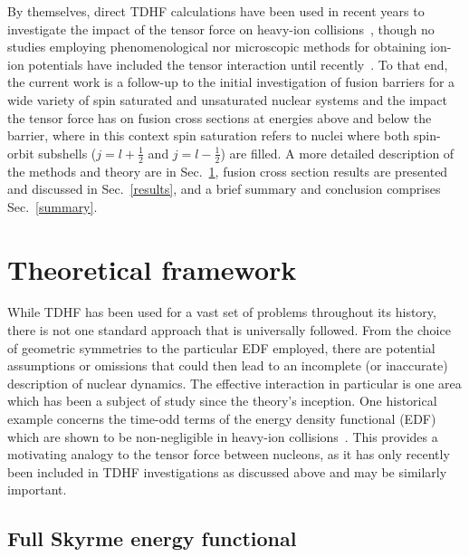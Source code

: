 \documentclass[aps,prc,twocolumn,showpacs,superscriptaddress,longbibliography,floatfix,10pt]{revtex4-1}
\begin{document}
By themselves, direct TDHF calculations have been used in recent years to investigate the impact of the tensor force on heavy-ion collisions~\cite{fracasso2012,dai2014a,stevenson2016,shi2017,guo2018}, though no studies employing phenomenological nor microscopic methods for obtaining ion-ion potentials have included the tensor interaction until recently~\cite{guo2018b}.
To that end, the current work is a follow-up to the initial investigation of fusion barriers for a wide variety of spin saturated and unsaturated nuclear systems and the impact the tensor force has on fusion cross sections at energies above and below the barrier, where in this context spin saturation refers to nuclei where both spin-orbit subshells ($j=l+\frac{1}{2}$ and $j=l-\frac{1}{2}$) are filled.
A more detailed description of the methods and theory are in Sec.~\ref{theory}, fusion cross section results are presented and discussed in Sec.~\ref{results}, and a brief summary and conclusion comprises Sec.~\ref{summary}. 

\section{Theoretical framework}
\label{theory}

While TDHF has been used for a vast set of problems throughout its history, there is not one standard approach that is universally followed.
From the choice of geometric symmetries to the particular EDF employed, there are potential assumptions or omissions that could then lead to an incomplete (or inaccurate) description of nuclear dynamics.
The effective interaction in particular is one area which has been a subject of study since the theory's inception.
One historical example concerns the time-odd terms of the energy density functional (EDF) which are shown to be non-negligible in heavy-ion collisions~\cite{umar2006c}.
This provides a motivating analogy to the tensor force between nucleons, as it has only recently been included in TDHF investigations as discussed above and may be similarly important.

\subsection{Full Skyrme energy functional}
\end{document}
